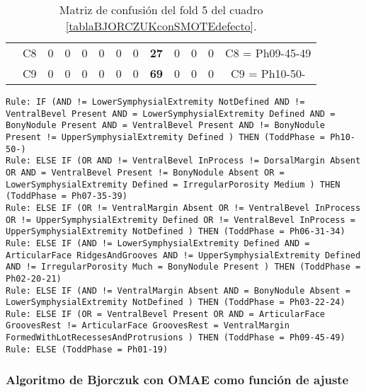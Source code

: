 \begin{table}[H]
{\begin{tabular}{|ccrrrrrrrrrrc|}
\multicolumn{1}{|c|}{}                                      & \multicolumn{1}{c|}{C8} & \multicolumn{1}{c|}{0}  & \multicolumn{1}{c|}{0}  & \multicolumn{1}{c|}{0}  & \multicolumn{1}{c|}{0}  & \multicolumn{1}{c|}{0}  & \multicolumn{1}{c|}{0}  & \multicolumn{1}{c|}{\textbf{27}} & \multicolumn{1}{c|}{0}  & \multicolumn{1}{c|}{0}  & \multicolumn{1}{c|}{0}  & C8 = Ph09-45-49   \\ \cline{2-13}
\multicolumn{1}{|c|}{}                                      & \multicolumn{1}{c|}{C9} & \multicolumn{1}{c|}{0}  & \multicolumn{1}{c|}{0}  & \multicolumn{1}{c|}{0}  & \multicolumn{1}{c|}{0}  & \multicolumn{1}{c|}{0}  & \multicolumn{1}{c|}{0}  & \multicolumn{1}{c|}{\textbf{69}} & \multicolumn{1}{c|}{0}  & \multicolumn{1}{c|}{0}  & \multicolumn{1}{c|}{0}  & C9 = Ph10-50-     \\ \hline
\end{tabular}%
}
\caption{Matriz de confusión del fold 5 del cuadro \ref{tablaBJORCZUKconSMOTEdefecto}.}
\end{table}


\begin{lstlisting}
Rule: IF (AND != LowerSymphysialExtremity NotDefined AND != VentralBevel Present AND = LowerSymphysialExtremity Defined AND = BonyNodule Present AND = VentralBevel Present AND != BonyNodule Present != UpperSymphysialExtremity Defined ) THEN (ToddPhase = Ph10-50-)
Rule: ELSE IF (OR AND != VentralBevel InProcess != DorsalMargin Absent OR AND = VentralBevel Present != BonyNodule Absent OR = LowerSymphysialExtremity Defined = IrregularPorosity Medium ) THEN (ToddPhase = Ph07-35-39)
Rule: ELSE IF (OR != VentralMargin Absent OR != VentralBevel InProcess OR != UpperSymphysialExtremity Defined OR != VentralBevel InProcess = UpperSymphysialExtremity NotDefined ) THEN (ToddPhase = Ph06-31-34)
Rule: ELSE IF (AND != LowerSymphysialExtremity Defined AND = ArticularFace RidgesAndGrooves AND != UpperSymphysialExtremity Defined AND != IrregularPorosity Much = BonyNodule Present ) THEN (ToddPhase = Ph02-20-21)
Rule: ELSE IF (AND != VentralMargin Absent AND = BonyNodule Absent = LowerSymphysialExtremity NotDefined ) THEN (ToddPhase = Ph03-22-24)
Rule: ELSE IF (OR = VentralBevel Present OR AND = ArticularFace GroovesRest != ArticularFace GroovesRest = VentralMargin FormedWithLotRecessesAndProtrusions ) THEN (ToddPhase = Ph09-45-49)
Rule: ELSE (ToddPhase = Ph01-19)
\end{lstlisting}


\subsubsection{Algoritmo de Bjorczuk con OMAE como función de ajuste}

